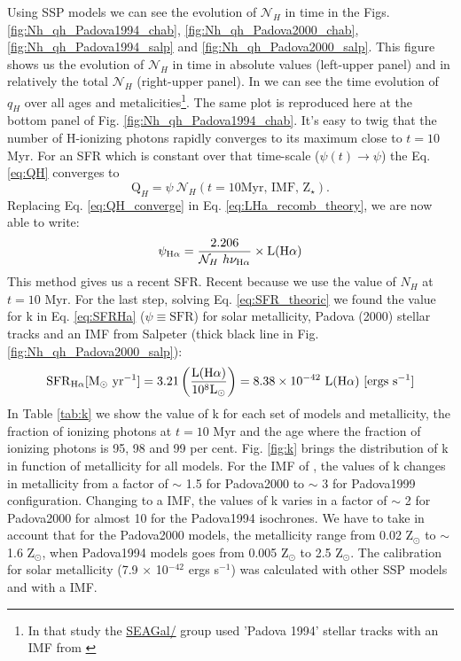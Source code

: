\documentclass[12pt,letterpaper,usenatbib,useAMS]{article}
\def\Ha{\ifmmode \mathrm{H}\alpha \else H$\alpha$\xspace \fi}
\def\LHalpha{\ifmmode \mathrm{L}(\mathrm{H}\alpha) \else L(H$\alpha$)\xspace \fi}
\begin{document}
Using \citet{BC03a} SSP models we can see the evolution of $\mathcal{N}_H$ in time in the Figs. \ref{fig:Nh_qh_Padova1994_chab}, \ref{fig:Nh_qh_Padova2000_chab}, \ref{fig:Nh_qh_Padova1994_salp} and \ref{fig:Nh_qh_Padova2000_salp}. This figure shows us the evolution of $\mathcal{N}_H$ in time in absolute values (left-upper panel) and in relatively the total $\mathcal{N}_H$ (right-upper panel). In \citet[Fig. 2b]{CF.etal.2011} we can see the time evolution of $q_H$ over all ages and metalicities\footnote{In that study the \href{http://starlight.ufsc.br}{SEAGal/\STARLIGHT} group used 'Padova 1994' \citep{Bertelli.etal.1994} stellar tracks with an IMF from \citet{Chabrier.2003a}}. The same plot is reproduced here at the bottom panel of Fig. \ref{fig:Nh_qh_Padova1994_chab}. It's easy to twig that the number of H-ionizing photons rapidly converges to its maximum close to $t=10$ Myr. For an SFR which is constant over that time-scale ($\psi(t) \rightarrow \psi$) the Eq. \ref{eq:QH} converges to
\begin{equation}
	\mathrm{Q}_H = \psi\ \mathcal{N}_H(t=10\textrm{Myr, IMF, Z}{}_\star).
	\label{eq:QH_converge}
\end{equation}
\noindent Replacing Eq. \ref{eq:QH_converge} in Eq. \ref{eq:LHa_recomb_theory}, we are now able to write:
\begin{equation}
	\psi_{\Ha} = \frac{2.206}{\mathcal{N}_H\ h \nu_{\Ha}} \times \LHalpha
	\label{eq:SFR_theoric}
\end{equation}
\noindent This method gives us a recent SFR. Recent because we use the value of $N_H$ at $t=10$ Myr. For the last step, solving Eq. \ref{eq:SFR_theoric} we found the value for k in Eq. \ref{eq:SFRHa} ($\psi \equiv \mathrm{SFR}$) for solar metallicity, Padova (2000) stellar tracks and an IMF from Salpeter (thick black line in Fig. \ref{fig:Nh_qh_Padova2000_salp}):
\begin{equation}
	\mathrm{SFR}_{\Ha} [\mathrm{M}_\odot\ \mathrm{yr}^{-1}] = 3.21\left(\frac{\LHalpha}{10^8\mathrm{L}_\odot}\right) = 8.38 \times 10^{-42}\ \LHalpha\  [\mathrm{ergs}\ \mathrm{s}^{-1}]
	\label{eq:SFRNeb}
\end{equation}
In Table \ref{tab:k} we show the value of k for each set of models and metallicity, the fraction of ionizing photons at $t=10$ Myr and the age where the fraction of ionizing photons is 95, 98 and 99 per cent. Fig. \ref{fig:k} brings the distribution of k in function of metallicity for all models. For the IMF of \citet{Salpeter.1955a}, the values of k changes in metallicity from a factor of $\sim$ 1.5 for Padova2000 to $\sim$ 3 for Padova1999 configuration. Changing to a \citet{Chabrier.2003a} IMF, the values of k varies in a factor of $\sim$ 2 for Padova2000 for almost 10 for the Padova1994 isochrones. We have to take in account that for the Padova2000 models, the metallicity range from 0.02 Z$_\odot$ to $\sim$ 1.6 Z$_\odot$, when Padova1994 models goes from 0.005 Z$_\odot$ to 2.5 Z$_\odot$. The \citet{Kennicutt.1998a} calibration for solar metallicity (7.9 $\times$ 10$^{-42}$ ergs s$^{-1}$) was calculated with other SSP models and with a \citet{Salpeter.1955a} IMF. 
\end{document}
